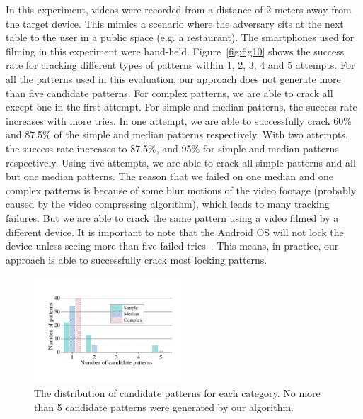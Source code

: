         In this experiment, videos were recorded from a distance of 2 meters away
        from the target device. This mimics a scenario where the adversary sits
        at the next table to the user in a public space (e.g. a restaurant).
        The smartphones used for filming in this experiment were hand-held.
        Figure~\ref{fig:fig10}
        shows the success rate for cracking different types of patterns within 1, 2, 3, 4 and 5 attempts.     For all the patterns used in this evaluation,
        our approach does not generate more than  five candidate patterns.
        For complex patterns, we are able to crack all except one in the first attempt.
        For simple and median patterns, the success rate increases with more tries.
        In one attempt, we are able to
        successfully crack 60\% and 87.5\% of the simple and median patterns respectively. With two attempts, the success rate increases to 87.5\%,
        and 95\% for simple and median patterns
        respectively. Using five attempts, we are able to
        crack all simple patterns and all but one median patterns.
       The reason that we failed on one median and one complex patterns is because of some blur motions of the video footage (probably
       caused by the video compressing algorithm), which leads
       to many tracking failures. But we are able to crack the same
       pattern using a video filmed by a different device.
        It is important to note that the Android OS will not lock the device unless seeing
        more than five failed tries~\cite{egelman2014you}. This means, in practice, our approach is able to
        successfully crack most locking patterns.

\begin{figure}[!t]
    \centering
    \includegraphics[width=0.5\textwidth]{fig/11.pdf}
    \caption{The distribution of candidate patterns for each category. No more than 5 candidate patterns were generated by our algorithm. }
    \label{fig:fig11}
\end{figure}


